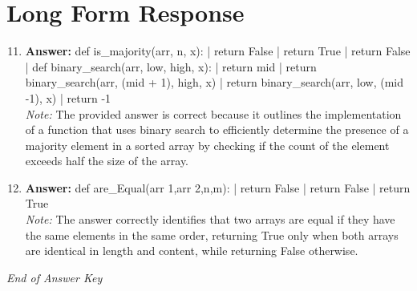 \documentclass[12pt]{article}
\begin{document}
\section*{Long Form Response}
\begin{enumerate}[label=\arabic*.]
\setcounter{enumi}{10}
\item \textbf{Answer:} def is\_majority(arr, n, x): | return False | return True | return False | def binary\_search(arr, low, high, x): | return mid | return binary\_search(arr, (mid + 1), high, x) | return binary\_search(arr, low, (mid -1), x) | return -1
\\ \textit{Note:} The provided answer is correct because it outlines the implementation of a function that uses binary search to efficiently determine the presence of a majority element in a sorted array by checking if the count of the element exceeds half the size of the array.
\item \textbf{Answer:} def are\_Equal(arr 1,arr 2,n,m): | return False | return False | return True
\\ \textit{Note:} The answer correctly identifies that two arrays are equal if they have the same elements in the same order, returning True only when both arrays are identical in length and content, while returning False otherwise.
\end{enumerate}

\vfill
\noindent\textit{End of Answer Key}
\end{document}
